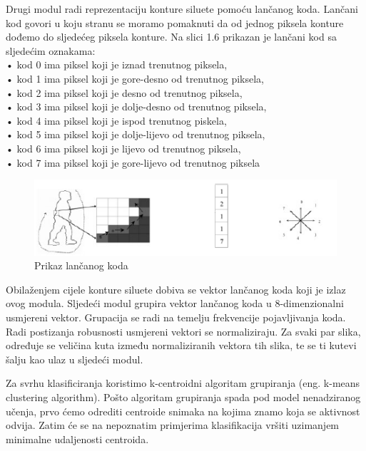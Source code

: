 \documentclass[times, utf8, diplomski]{fer}
\begin{document}
Drugi modul radi reprezentaciju konture siluete pomoću lančanog koda. Lančani kod govori
u koju stranu se moramo pomaknuti da od jednog piksela konture dođemo do sljedećeg
piksela konture. Na slici 1.6 prikazan je lančani kod sa sljedećim oznakama: \\
• kod 0 ima piksel koji je iznad trenutnog piksela, \\
• kod 1 ima piksel koji je gore-desno od trenutnog piksela, \\
• kod 2 ima piksel koji je desno od trenutnog piksela, \\
• kod 3 ima piksel koji je dolje-desno od trenutnog piksela, \\
• kod 4 ima piksel koji je ispod trenutnog piskela, \\
• kod 5 ima piksel koji je dolje-lijevo od trenutnog piksela, \\
• kod 6 ima piksel koji je lijevo od trenutnog piksela, \\
• kod 7 ima piksel koji je gore-lijevo od trenutnog piksela \\
\newline
\begin{figure}[ht!]
\centering
\includegraphics[width=160mm]{lancanikod.png}
\caption{ Prikaz lančanog koda \label{overflow}}
\end{figure}


Obilaženjem cijele konture siluete dobiva se vektor lančanog koda koji je izlaz ovog modula.
Sljedeći modul grupira vektor lančanog koda u 8-dimenzionalni usmjereni vektor. Grupacija
se radi na temelju frekvencije pojavljivanja koda. Radi postizanja robusnosti usmjereni
vektori se normaliziraju. Za svaki par slika, određuje se veličina kuta između normaliziranih
vektora tih slika, te se ti kutevi šalju kao ulaz u sljedeći modul.

Za svrhu klasificiranja koristimo k-centroidni algoritam grupiranja (eng. k-means clustering
algorithm). Pošto algoritam grupiranja spada pod model nenadziranog učenja, prvo ćemo
odrediti centroide snimaka na kojima znamo koja se aktivnost odvija. Zatim će se na
nepoznatim primjerima klasifikacija vršiti uzimanjem minimalne udaljenosti centroida.
\end{document}
